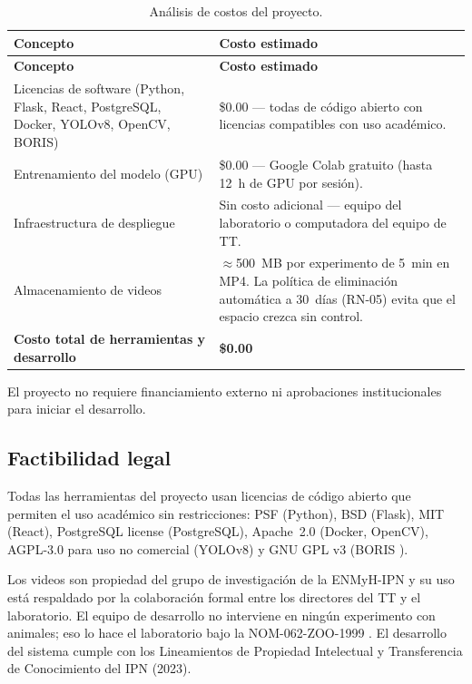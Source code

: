 \begin{longtable}{|p{5.8cm}|p{7.5cm}|}
\caption{Análisis de costos del proyecto.
\label{tab:costos}}\\
\hline
\textbf{Concepto} & \textbf{Costo estimado} \\
\hline
\endfirsthead
\hline
\textbf{Concepto} & \textbf{Costo estimado} \\
\hline
\endhead
\hline
\endfoot

Licencias de software (Python, Flask, React, PostgreSQL, Docker, YOLOv8, OpenCV, BORIS)
    & \$0.00 --- todas de código abierto con licencias compatibles con uso académico. \\
\hline
Entrenamiento del modelo (GPU)
    & \$0.00 --- Google Colab gratuito (hasta 12~h de GPU por sesión). \\
\hline
Infraestructura de despliegue
    & Sin costo adicional --- equipo del laboratorio o computadora del equipo de TT. \\
\hline
Almacenamiento de videos
    & $\approx$500~MB por experimento de 5~min en MP4. La política de eliminación
      automática a 30~días (RN-05) evita que el espacio crezca sin control. \\
\hline
\textbf{Costo total de herramientas y desarrollo} & \textbf{\$0.00} \\
\hline

\end{longtable}

El proyecto no requiere financiamiento externo ni aprobaciones institucionales para
iniciar el desarrollo.

\subsection{Factibilidad legal}

Todas las herramientas del proyecto usan licencias de código abierto que permiten el
uso académico sin restricciones: PSF (Python), BSD (Flask), MIT (React), PostgreSQL
license (PostgreSQL), Apache~2.0 (Docker, OpenCV), AGPL-3.0 para uso no comercial
(YOLOv8) y GNU GPL v3 (BORIS \cite{friard2016}).

Los videos son propiedad del grupo de investigación de la ENMyH-IPN y su uso está
respaldado por la colaboración formal entre los directores del TT y el laboratorio.
El equipo de desarrollo no interviene en ningún experimento con animales; eso lo hace
el laboratorio bajo la NOM-062-ZOO-1999 \cite{nom062}. El desarrollo del sistema
cumple con los Lineamientos de Propiedad Intelectual y Transferencia de Conocimiento
del IPN (2023).

